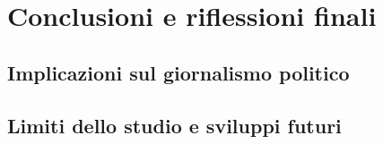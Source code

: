 \chapter{Conclusioni e riflessioni finali}

\section{Implicazioni sul giornalismo politico}

\section{Limiti dello studio e sviluppi futuri}